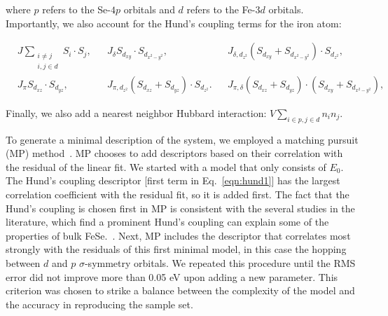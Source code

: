 \documentclass[aps, prb, 11pt]{revtex4-1}
\begin{document}
where $p$ refers to the Se-$4p$ orbitals and $d$ refers to the Fe-$3d$ orbitals. 
Importantly, we also account for the Hund's coupling terms for the iron atom:

\begin{align}
  &J \sum_{\substack{i\ne j \\i,j \in d}} S_i \cdot S_j,&
  &J_{\delta} S_{d_{xy}} \cdot S_{d_{x^2-y^2}},&
  &J_{\delta,d_{z^2}} (S_{d_{xy}} + S_{d_{x^2-y^2}}) \cdot S_{d_{z^2}},& \label{eqn:hund1}
  \nonumber \\
  &J_{\pi} S_{d_{xz}} \cdot S_{d_{yz}},&
  &J_{\pi,d_{z^2}} (S_{d_{xz}} + S_{d_{yz}}) \cdot S_{d_{z^2}}.&
  &J_{\pi,\delta} (S_{d_{xz}} + S_{d_{yz}}) \cdot (S_{d_{xy}} + S_{d_{x^2-y^2}}),&
\end{align}

Finally, we also add a nearest neighbor Hubbard interaction: $V \sum_{i\in p, j\in d} n_{i} n_j$.

To generate a minimal description of the system, we employed a matching pursuit (MP) method~\cite{MP_Zhang1993}.
MP chooses to add descriptors based on their correlation with the residual of the linear fit. 
We started with a model that only consists of $E_0$. The Hund's coupling descriptor [first term in Eq.~\eqref{eqn:hund1}]
has the largest correlation coefficient with the residual fit, so it is added first. The fact that the Hund's coupling is chosen first in MP 
is consistent with the several studies in the literature, which find a prominent Hund's coupling can explain some 
of the properties of bulk FeSe.~\cite{demedici_hunds_2011,de_medici_janus-faced_2011,georges_strong_2013,busemeyer_competing_2016}. 
Next, MP includes the descriptor that correlates most strongly with the residuals of this first minimal model, in this case the hopping between $d$ and $p$ $\sigma$-symmetry orbitals. 
We repeated this procedure until the RMS error did not improve more than 0.05 eV upon adding a new parameter.
This criterion was chosen to strike a balance between the complexity of the model and the accuracy in reproducing the sample set.
\end{document}

